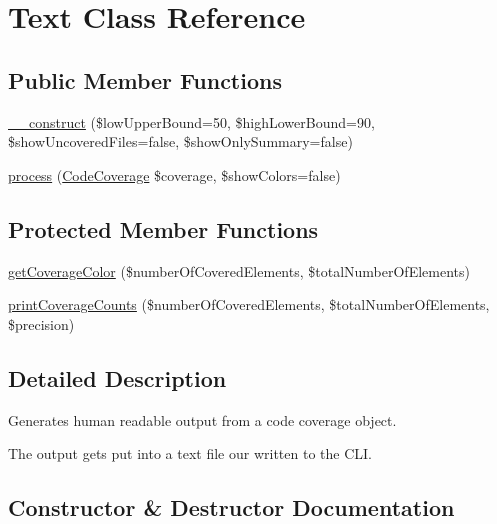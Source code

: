 \hypertarget{class_sebastian_bergmann_1_1_code_coverage_1_1_report_1_1_text}{}\section{Text Class Reference}
\label{class_sebastian_bergmann_1_1_code_coverage_1_1_report_1_1_text}
\subsection*{Public Member Functions}
\begin{DoxyCompactItemize}
\item 
\mbox{\hyperlink{class_sebastian_bergmann_1_1_code_coverage_1_1_report_1_1_text_ab511fb1f736471dca809558309dcb2f3}{\+\_\+\+\_\+construct}} (\$low\+Upper\+Bound=50, \$high\+Lower\+Bound=90, \$show\+Uncovered\+Files=false, \$show\+Only\+Summary=false)
\item 
\mbox{\hyperlink{class_sebastian_bergmann_1_1_code_coverage_1_1_report_1_1_text_a4b668f622039bffd173a86fe1f86c7a7}{process}} (\mbox{\hyperlink{class_sebastian_bergmann_1_1_code_coverage_1_1_code_coverage}{Code\+Coverage}} \$coverage, \$show\+Colors=false)
\end{DoxyCompactItemize}
\subsection*{Protected Member Functions}
\begin{DoxyCompactItemize}
\item 
\mbox{\hyperlink{class_sebastian_bergmann_1_1_code_coverage_1_1_report_1_1_text_aa046f277e8570e49245120457f2a7c1d}{get\+Coverage\+Color}} (\$number\+Of\+Covered\+Elements, \$total\+Number\+Of\+Elements)
\item 
\mbox{\hyperlink{class_sebastian_bergmann_1_1_code_coverage_1_1_report_1_1_text_a293834707b0c4f469102bdbea1147d82}{print\+Coverage\+Counts}} (\$number\+Of\+Covered\+Elements, \$total\+Number\+Of\+Elements, \$precision)
\end{DoxyCompactItemize}


\subsection{Detailed Description}
Generates human readable output from a code coverage object.

The output gets put into a text file our written to the C\+LI. 

\subsection{Constructor \& Destructor Documentation}
\mbox{\label{class_sebastian_bergmann_1_1_code_coverage_1_1_report_1_1_text_ab511fb1f736471dca809558309dcb2f3}} 
